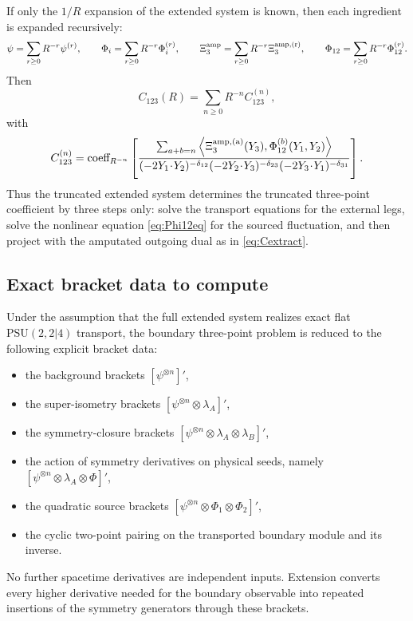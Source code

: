 \documentclass[11pt]{article}
\newcommand{\PSU}{\mathrm{PSU}(2,2|4)}
\begin{document}
If only the $1/R$ expansion of the extended system is known, then each ingredient is expanded recursively:
\begin{equation}
\psi=\sum_{r\ge 0}R^{-r}\psi^{(r)},
\qquad
\Phi_i=\sum_{r\ge 0}R^{-r}\Phi_i^{(r)},
\qquad
\Xi_3^{\rm amp}=\sum_{r\ge 0}R^{-r}\Xi_3^{\rm amp,(r)},
\qquad
\Phi_{12}=\sum_{r\ge 0}R^{-r}\Phi_{12}^{(r)}.
\label{eq:Rexpansion}
\end{equation}
Then
\begin{equation}
C_{123}(R)=\sum_{n\ge 0}R^{-n}C_{123}^{(n)},
\label{eq:Cexpansion}
\end{equation}
with
\begin{equation}
C_{123}^{(n)}
=
\text{coeff}_{R^{-n}}
\left[
\frac{
\sum_{a+b=n}
\left\langle
\Xi_3^{\rm amp,(a)}(Y_3),\Phi_{12}^{(b)}(Y_1,Y_2)
\right\rangle
}
{(-2Y_1\!\cdot\!Y_2)^{-\delta_{12}}
 (-2Y_2\!\cdot\!Y_3)^{-\delta_{23}}
 (-2Y_3\!\cdot\!Y_1)^{-\delta_{31}}}
\right].
\label{eq:Cnextract}
\end{equation}
Thus the truncated extended system determines the truncated three-point coefficient by three steps only: solve the transport equations for the external legs, solve the nonlinear equation \cref{eq:Phi12eq} for the sourced fluctuation, and then project with the amputated outgoing dual as in \cref{eq:Cextract}.

\subsection{Exact bracket data to compute}

Under the assumption that the full extended system realizes exact flat $\PSU$ transport, the boundary three-point problem is reduced to the following explicit bracket data:
\begin{itemize}
\item the background brackets $[\psi^{\otimes n}]'$,
\item the super-isometry brackets $[\psi^{\otimes n}\otimes \lambda_A]'$,
\item the symmetry-closure brackets $[\psi^{\otimes n}\otimes \lambda_A\otimes \lambda_B]'$,
\item the action of symmetry derivatives on physical seeds, namely $[\psi^{\otimes n}\otimes \lambda_A\otimes \Phi]'$,
\item the quadratic source brackets $[\psi^{\otimes n}\otimes \Phi_1\otimes \Phi_2]'$,
\item the cyclic two-point pairing on the transported boundary module and its inverse.
\end{itemize}
No further spacetime derivatives are independent inputs. Extension converts every higher derivative needed for the boundary observable into repeated insertions of the symmetry generators through these brackets.
\end{document}
